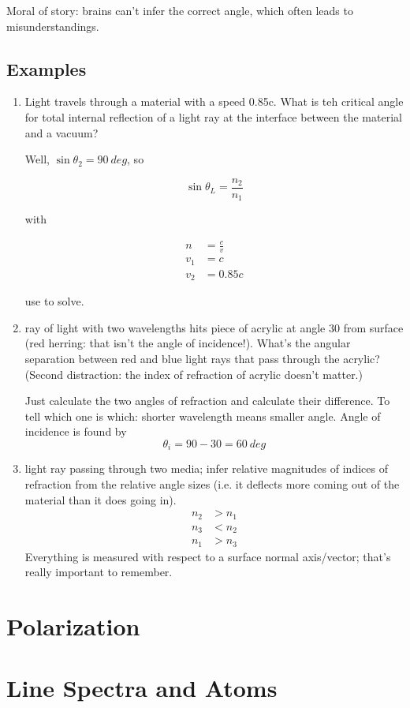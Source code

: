 \documentclass[twocolumn,draft]{article}
\begin{document}
Moral of story: brains can't infer the correct angle, which often leads to misunderstandings.

\subsection*{Examples}
\begin{enumerate}
	\item 
		Light travels through a material with a speed 0.85c. What is teh critical angle for total
		internal
		reflection of a light ray at the interface between the material and a vacuum?

		Well, $\sin{\theta_{2}}=90~deg$, so

		\begin{equation}
			\sin{\theta_{L}} = \frac{n_{2}}{n_{1}}
		\end{equation}

		with

		\begin{align*}
			n &= \frac{c}{v} \\
			v_{1} &= c \\
			v_{2} &= 0.85c
		\end{align*}

		use to solve.
	
	\item
		ray of light with two wavelengths hits piece of acrylic at angle 30 from surface (red
		herring:
		that isn't the angle of incidence!). What's the angular separation between red and blue
		light
		rays that pass through the acrylic? (Second distraction: the index of refraction of acrylic
		doesn't matter.)
		
		Just calculate the two angles of refraction and calculate their difference. To tell which
		one is which: shorter wavelength means smaller angle. Angle of incidence is found by
			\begin{equation*}
				\theta_{i} = 90 - 30 = 60 ~deg
			\end{equation*}
			
	\item light ray passing through two media; infer relative magnitudes of indices of refraction
		from the relative angle sizes (i.e. it deflects more coming out of the material than it
		does going in).
			\begin{align*}
				n_{2} &> n_{1} \\
				n_{3} &< n_{2} \\
				n_{1} &> n_{3}
			\end{align*}
		Everything is measured with respect to a surface normal axis/vector; that's really important
		to remember.
			
\end{enumerate}

\section*{Polarization}

\section*{Line Spectra and Atoms}

  
\end{document}
